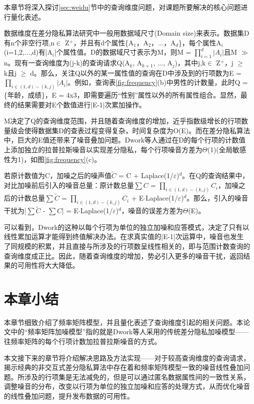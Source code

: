 本章节将深入探讨\ref{sec:weidu}节中的查询维度问题，对课题所要解决的核心问题进行量化表述。

数据维度在差分隐私算法研究中一般用数据域尺寸(Domain size)来表示。数据集D有n个非空行项,n$\in$ Z$^{+}$，并且有d个属性\{A$_{1}$，A$_{2}$，...，A$_{d}$\}，每个属性A$_{i}$(i=1,2,...,d)有|A$_{i}$|个属性值。D的数据域尺寸表示为M，则M = \(\prod\limits_{i = 1}^d {|A{_i} |}\)且M $\gg$ n。现有一查询维度为(j-k)的查询请求Q(A$_{k}$, A$_{k+1}$, ..., A$_{j}$)，其中j,k$\in$ Z$^{+}$，j $\geqslant$ k且j $\geqslant$ d。那么，关注Q以外的某一属性值的查询在D中涉及到的行项数为E = \(\prod\nolimits_{i \in (1,d) - (k,j)} {|A{_i} |} \)。例如，查询表\ref{fig:frequency}(b)中男性的计数量，此时Q = \{年龄，成绩\}，E = 4x3，即需要遍历“性别”属性以外的所有属性组合。显然，最终的结果需要对E个数值进行|E-1|次累加操作。

M决定了Q的查询维度范围，并且随着查询维度的增加，近乎指数级增长的行项数量级会使得数据集D的查表过程变得复杂，时间复杂度为O(E)。而在差分隐私算法中，巨大的E值还带来了噪音叠加问题。Dwork\cite{Dwork Calibrating}等人通过在D的每个行项的计数值上添加独立的拉普拉斯噪音以实现差分隐私，每个行项噪音方差为$\Theta$(1)(全局敏感性为1)，如图\ref{fig:frequency}(c)。

若原计数值为C，加噪之后的噪声值$\widetilde{C}$ = C + Laplace(1/$\varepsilon$)$^d$。在Q的查询结果中，对比加噪前后引入的噪音总量：原计数总量$\sum{C}$ = \(\prod\nolimits_{i \in (1,d) - (k,j)} {C{_i}} \)，加噪之后的计数总量$\sum{\widetilde{C}}$ = \(\prod\nolimits_{i \in (1,d) - (k,j)} {C{_i}} \) + E$\cdotp$Laplace(1/$\varepsilon$)$^d$。那么，引入的噪音干扰为|$\sum{\widetilde{C}}$ - $\sum{C}$| = E$\cdotp$Laplace(1/$\varepsilon$)$^d$，噪音的误差方差为$\Theta$(E)。

可以看到，Dwork的这种以每个行项为单位的独立加噪和应答模式，决定了只有以线性累加运算才能得到终值解决办法。在求真实值的|E-1|次运算中，噪音也发生了同规模的积累，并且直接与所涉及的行项数呈线性相关的，即与范围计数查询的查询维度成正比。因此，随着查询维度的增加，势必引入更多的噪音干扰，返回结果的可用性将大大降低。

\section{本章小结}

本章节细致介绍了频率矩阵模型，并且量化表述了查询维度引起的相关问题。本论文中的“频率矩阵加噪模型”指的就是Dwork等人采用的传统差分隐私加噪模型——往频率矩阵的每个行项计数加拉普拉斯噪音的方式。

本文接下来的章节将介绍解决思路及方法实现——对于较高查询维度的查询请求，揭示经典的非交互式差分隐私算法中存在着和频率矩阵模型一致的噪音线性叠加问题。所涉及的行项集是无法减免的，但是可以通过匿名数据属性间的一致性关系，调整噪音的分布，改变以行项为单位的独立加噪和应答的处理方式，从而优化噪音的线性叠加问题，提升发布数据的可用性。


